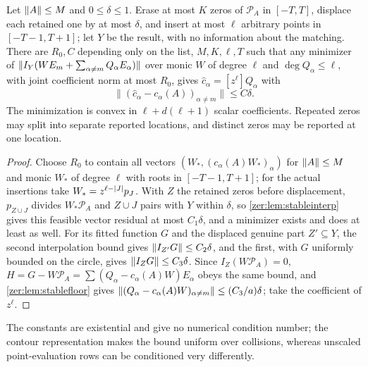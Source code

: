 \begin{theorem}\label{zer:thm:stabledecoder}
Let $\lVert A\rVert\le M$ and $0\le\delta\le1$. Erase at most $K$ zeros of $\mathcal P_A$ in $[-T,T]$, displace each
retained one by at most $\delta$, and insert at most $\ell$ arbitrary points in $[-T-1,T+1]$; let $Y$ be the
result, with no information about the matching. There are $R_0,C$ depending only on the list, $M,K,\ell,T$
such that any minimizer of $\lVert I_Y(WE_m+\sum_{\alpha\ne m}Q_\alpha E_\alpha)\rVert$ over monic $W$ of degree
$\ell$ and $\deg Q_\alpha\le\ell$, with joint coefficient norm at most $R_0$, gives $\widehat c_\alpha=[z^\ell]Q_\alpha$
with
\[
 \bigl\|(\widehat c_\alpha-c_\alpha(A))_{\alpha\ne m}\bigr\|\le C\delta .
\]
The minimization is convex in $\ell+d(\ell+1)$ scalar coefficients. Repeated zeros may split into separate
reported locations, and distinct zeros may be reported at one location.
\end{theorem}
\begin{proof}
Choose $R_0$ to contain all vectors $(W_*,(c_\alpha(A)W_*)_\alpha)$ for $\lVert A\rVert\le M$ and monic $W_*$ of degree
$\ell$ with roots in $[-T-1,T+1]$; for the actual insertions take $W_*=z^{\ell-\lvert J\rvert}p_J$. With $Z$ the
retained zeros before displacement, $p_{Z\cup J}$ divides $W_*\mathcal P_A$ and $Z\cup J$ pairs with $Y$
within $\delta$, so \cref{zer:lem:stableinterp} gives this feasible vector residual at most $C_1\delta$, and a
minimizer exists and does at least as well. For its fitted function $G$ and the displaced genuine part
$Z'\subseteq Y$, the second interpolation bound gives $\lVert I_{Z'}G\rVert\le C_2\delta$, and the first, with $G$
uniformly bounded on the circle, gives $\lVert I_ZG\rVert\le C_3\delta$. Since $I_Z(W\mathcal P_A)=0$,
$H=G-W\mathcal P_A=\sum(Q_\alpha-c_\alpha(A)W)E_\alpha$ obeys the same bound, and \cref{zer:lem:stablefloor} gives
$\lVert(Q_\alpha-c_\alpha(A)W)_{\alpha\ne m}\rVert\le(C_3/a)\delta$; take the coefficient of $z^\ell$.
\end{proof}

The constants are existential and give no numerical condition number; the contour representation makes the
bound uniform over collisions, whereas unscaled point-evaluation rows can be conditioned very differently.

